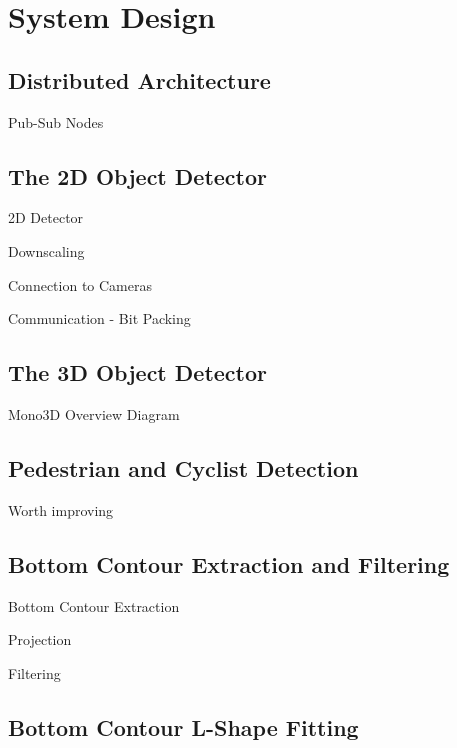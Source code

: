 
\chapter{System Design}
\label{ch:system}

\section{Distributed Architecture}
\label{sec:arch}

Pub-Sub Nodes


\section{The 2D Object Detector}
\label{sec:segmentation}

2D Detector \par
Downscaling \par
Connection to Cameras \par
Communication - Bit Packing

\section{The 3D Object Detector}
\label{sec:mono3doverview}

Mono3D Overview Diagram

\section{Pedestrian and Cyclist Detection}
\label{sec:pedcyc}

Worth improving


\section{Bottom Contour Extraction and Filtering}
\label{sec:botcont}

Bottom Contour Extraction \par
Projection \par
Filtering

\section{Bottom Contour L-Shape Fitting}
\label{sec:botcontlsf}


